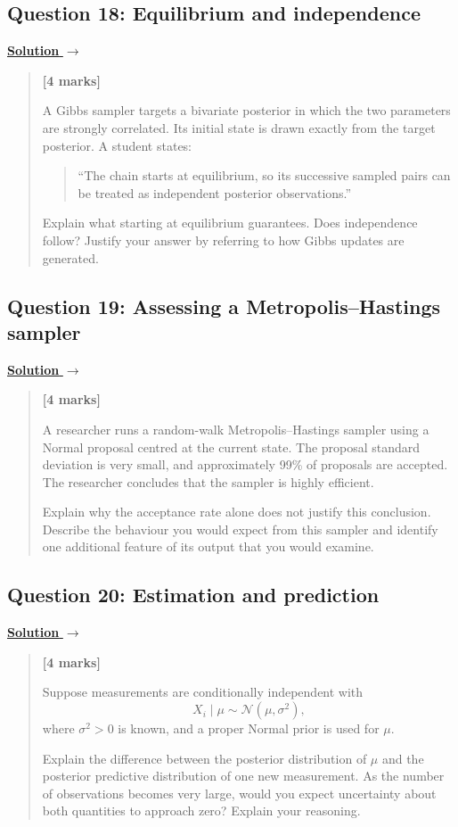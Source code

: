 \documentclass[11pt,a4paper]{article}
\newenvironment{examquestion}[2]
  {\subsection{#1}\label{question:\arabic{subsection}}\label{#2}%
   \noindent\hyperref[answer:\arabic{subsection}]{\textbf{Solution} $\rightarrow$}%
   \begin{quote}\color{statgrey}}
  {\end{quote}}
\begin{document}
\clearpage

\begin{examquestion}{Question 18: Equilibrium and independence}{question:practice-equilibrium-and-independence}
\textbf{[4 marks]}

A Gibbs sampler targets a bivariate posterior in which the two parameters are
strongly correlated. Its initial state is drawn exactly from the target
posterior. A student states:
\begin{quote}
``The chain starts at equilibrium, so its successive sampled pairs can be
treated as independent posterior observations.''
\end{quote}
Explain what starting at equilibrium guarantees. Does independence follow?
Justify your answer by referring to how Gibbs updates are generated.
\end{examquestion}

\clearpage

\begin{examquestion}{Question 19: Assessing a Metropolis--Hastings sampler}{question:practice-assessing-a-metropolis-hastings-sampler}
\textbf{[4 marks]}

A researcher runs a random-walk Metropolis--Hastings sampler using a Normal
proposal centred at the current state. The proposal standard deviation is
very small, and approximately 99\% of proposals are accepted. The researcher
concludes that the sampler is highly efficient.

Explain why the acceptance rate alone does not justify this conclusion.
Describe the behaviour you would expect from this sampler and identify one
additional feature of its output that you would examine.
\end{examquestion}

\clearpage

\begin{examquestion}{Question 20: Estimation and prediction}{question:practice-estimation-and-prediction}
\textbf{[4 marks]}

Suppose measurements are conditionally independent with
\[
X_i\mid\mu\sim\mathcal{N}(\mu,\sigma^2),
\]
where $\sigma^2>0$ is known, and a proper Normal prior is used for $\mu$.

Explain the difference between the posterior distribution of $\mu$ and the
posterior predictive distribution of one new measurement. As the number of
observations becomes very large, would you expect uncertainty about both
quantities to approach zero? Explain your reasoning.
\end{examquestion}
\end{document}
